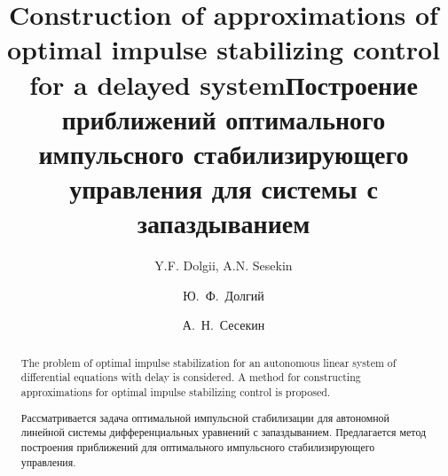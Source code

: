 \begin{englishtitle}
\title{Construction of approximations of optimal impulse stabilizing control for a delayed system}
\author{Y.F. Dolgii, A.N. Sesekin}

\maketitle

\begin{abstract}
The problem of optimal impulse stabilization for an autonomous linear system of differential equations with delay is considered. A method for constructing approximations for optimal impulse stabilizing control is proposed.

\end{abstract}
\end{englishtitle}

\iffalse
\documentclass[12pt]{llncs}
\usepackage[T2A]{fontenc}
\usepackage[utf8]{inputenc}
\usepackage[english,russian]{babel}
\usepackage[russian]{nla}




\fi

\title{Построение приближений оптимального импульсного стабилизирующего управления для системы с запаздыванием}
\author{Ю.~Ф.~Долгий   \and  А.~Н.~Сесекин } %

\maketitle

\begin{abstract}
Рассматривается задача оптимальной импульсной стабилизации для автономной линейной системы дифференциальных уравнений с запаздыванием. Предлагается метод построения  приближений для оптимального импульсного стабилизирующего управления.

\end{abstract}


